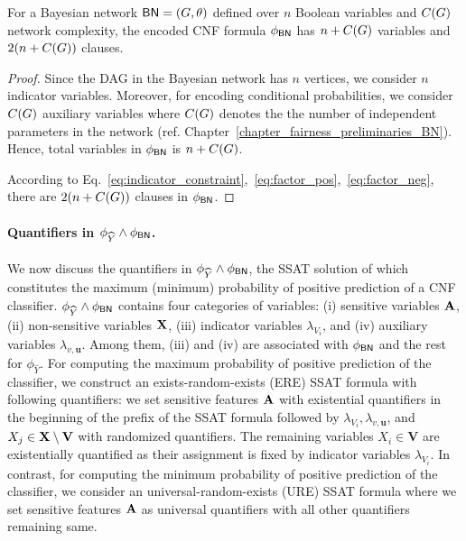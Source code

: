 \begin{lemma}
	For a Bayesian network $ \mathsf{BN} = (G, \theta) $ defined over $ n $ Boolean variables and $ C(G) $ network complexity, the encoded CNF formula $ \phi_{\mathsf{BN}} $ has $ n + C(G) $  variables and $ 2(n + C(G)) $ clauses. 
\end{lemma}
\begin{proof}
	Since the DAG in the Bayesian network has $ n $ vertices, we consider $ n $ indicator variables. Moreover, for encoding conditional probabilities, we consider $ C(G) $ auxiliary variables where $ C(G) $ denotes the the number of independent parameters in the network (ref. Chapter~\ref{chapter_fairness_preliminaries_BN}). Hence, total variables in $ \phi_{\mathsf{BN}} $ is $ n + C(G)  $.
	
	According to Eq.~\eqref{eq:indicator_constraint},~\eqref{eq:factor_pos},~\eqref{eq:factor_neg}, there are $2( n + C(G)) $ clauses in $ \phi_{\mathsf{BN}} $.
	
	
\end{proof}



\paragraph{Quantifiers in $ \phi_{\widehat{Y}} \wedge \phi_{\mathsf{BN}} $.}
We now discuss the quantifiers in $ \phi_{\widehat{Y}} \wedge \phi_{\mathsf{BN}} $, the SSAT solution of which  constitutes the maximum (minimum) probability of positive prediction of a CNF classifier. $ \phi_{\widehat{Y}} \wedge \phi_{\mathsf{BN}} $ contains four  categories of variables: (i) sensitive variables $ \mathbf{A} $, (ii) non-sensitive variables $ \mathbf{X} $, (iii) indicator variables $  \lambda_{V_i} $, and (iv) auxiliary variables $ \lambda_{v,\mathbf{u}} $. Among them, (iii) and (iv) are associated with $ \phi_{\mathsf{BN}} $ and the rest for $ \phi_{\widehat{Y}} $. For computing the maximum probability of positive prediction of the classifier, we construct  an exists-random-exists (ERE) SSAT formula with following quantifiers: we set sensitive features $ \mathbf{A} $ with existential quantifiers in the beginning of the prefix of the SSAT formula followed by $  \lambda_{V_i}, \lambda_{v,\mathbf{u}} $, and $ X_j \in \mathbf{X} \setminus \mathbf{V} $ with randomized quantifiers. The remaining variables  $ X_i \in \mathbf{V} $ are existentially quantified as their assignment is fixed by indicator variables $ \lambda_{V_i} $. In contrast, for computing the minimum probability of positive prediction of the classifier, we consider an universal-random-exists (URE) SSAT formula  where we set sensitive features $ \mathbf{A} $ as universal quantifiers with all other quantifiers remaining same.
